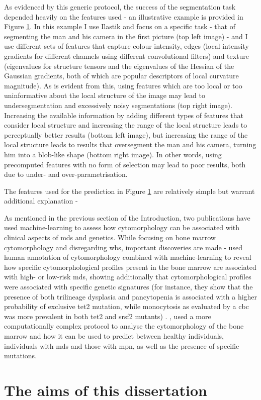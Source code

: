 As evidenced by this generic protocol, the success of the segmentation task depended heavily on the features used -  an illustrative example is provided in Figure \ref{fig:segmentation-example}. In this example I use Ilastik \cite{Sommer2011-ds} and focus on a specific task - that of segmenting the man and his camera in the first picture (top left image) - and I use different sets of features that capture colour intensity, edges (local intensity gradients for different channels using different convolutional filters) and texture (eigenvalues for structure tensors and the eigenvalues of the Hessian of the Gaussian gradients, both of which are popular descriptors of local curvature magnitude). As is evident from this, using features which are too local or too uninformative about the local structure of the image may lead to undersegmentation and excessively noisy segmentations (top right image). Increasing the available information by adding different types of features that consider local structure and increasing the range of the local structure leads to perceptually better results (bottom left image), but increasing the range of the local structure leads to results that oversegment the man and his camera, turning him into a blob-like shape (bottom right image). In other words, using precomputed features with no form of selection may lead to poor results, both due to under- and over-parametrisation. 

\begin{figure}
	\label{fig:segmentation-example}
\end{figure}

The features used for the prediction in Figure \ref{fig:segmentation-example} are relatively simple but warrant additional explanation - 


As mentioned in the previous section of the Introduction, two publications have used machine-learning to assess how cytomorphology can be associated with clinical aspects of \ac{mds} and genetics. While focusing on bone marrow cytomorphology and disregarding \ac{wbs}, important discoveries are made -  used human annotation of cytomorphology combined with machine-learning to reveal how specific cytomorphological profiles present in the bone marrow are associated with high- or low-risk \ac{mds}, showing additionally that cytomorphological profiles were associated with specific genetic signatures (for instance, they show that the presence of both trilineage dysplasia and pancytopenia is associated with a higher probability of exclusive \ac{tet2} mutation, while monocytosis as evaluated by a \ac{cbc} was more prevalent in both \ac{tet2} and \ac{srsf2} mutants) \cite{Nagata2020-lh}. , used a more computationally complex protocol to analyse the cytomorphology of the bone marrow and how it can be used to predict between healthy individuals, individuals with \ac{mds} and those with \ac{mpn}, as well as the presence of specific mutations. 

\section{The aims of this dissertation}

